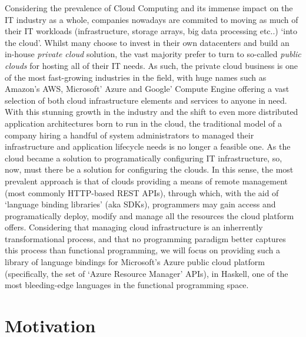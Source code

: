 \documentclass[11pt]{report}
\begin{document}
Considering the prevalence of Cloud Computing and its immense impact on the IT
industry as a whole, companies nowadays are commited to moving as much of their
IT workloads (infrastructure, storage arrays, big data processing etc..) `into
the cloud'. Whilst many choose to invest in their own datacenters and build
an in-house \textit{private cloud} solution, the vast majority prefer to turn
to so-called \textit{public clouds} for hosting all of their IT needs. As such,
the private cloud business is one of the most fast-growing industries in the
field, with huge names such as Amazon's AWS, Microsoft' Azure and Google'
Compute Engine offering a vast selection of both cloud infrastructure elements
and services to anyone in need. \newline
With this stunning growth in the industry and the shift to even more distributed
application architectures born to run in the cloud, the traditional model of a
company hiring a handful of system administrators to managed their
infrastructure and application lifecycle needs is no longer a feasible one.
As the cloud became a solution to programatically configuring IT
infrastructure, so, now, must there be a solution for configuring the clouds.
In this sense, the most prevalent approach is that of clouds providing a means of
remote management (most commonly HTTP-based REST APIs), through which, with the
aid of `language binding libraries' (aka SDKs), programmers may gain access and
programatically deploy, modify and manage all the resources the cloud platform
offers. \newline
Considering that managing cloud infrastructure is an inherrently
transformational process, and that no programming paradigm better captures this
process than functional programming, we will focus on providing such a library
of language bindings for Microsoft's Azure public cloud platform (specifically,
the set of `Azure Resource Manager' APIs), in Haskell, one of the most
bleeding-edge languages in the functional programming space.


\section{Motivation}
\end{document}
